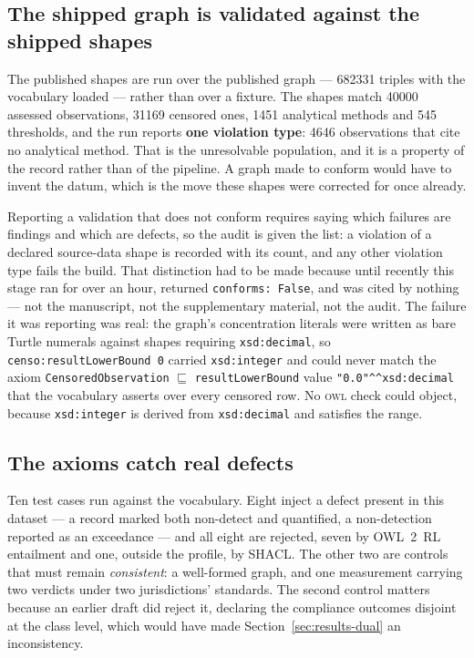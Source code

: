 \subsection{The shipped graph is validated against the shipped shapes}
\label{sec:results-shacl}
The published shapes are run over the published graph --- \num{682331} triples
with the vocabulary loaded --- rather than over a fixture.
The shapes match \num{40000} assessed observations, \num{31169} censored ones,
\num{1451} analytical methods and \num{545} thresholds, and the run reports
\textbf{one violation type}: \num{4646} observations that cite no analytical
method. That is the unresolvable population, and it is a property of the record
rather than of the pipeline. A graph made to conform would have to invent the
datum, which is the move these shapes were corrected for once already.

Reporting a validation that does not conform requires saying which failures are
findings and which are defects, so the audit is given the list: a violation of a
declared source-data shape is recorded with its count, and any other violation
type fails the build. That distinction had to be made
because until recently this stage ran for over an hour, returned
\texttt{conforms: False}, and was cited by nothing --- not the manuscript, not
the supplementary material, not the audit. The failure it was reporting was
real: the graph's concentration literals were written as bare Turtle
numerals against shapes requiring \texttt{xsd:decimal}, so
\texttt{censo:resultLowerBound 0} carried \texttt{xsd:integer} and could never match the axiom
\texttt{CensoredObservation} $\sqsubseteq$ \texttt{resultLowerBound} value
\texttt{"0.0"\^{}\^{}xsd:decimal} that the vocabulary asserts over every censored
row. No \textsc{owl} check could object, because \texttt{xsd:integer} is derived
from \texttt{xsd:decimal} and satisfies the range.

\subsection{The axioms catch real defects}
Ten test cases run against the vocabulary. Eight
inject a defect present in this dataset --- a record marked both non-detect and
quantified, a non-detection reported as an exceedance --- and all eight are
rejected, seven by OWL~2~RL entailment and one, outside the profile, by SHACL.
The other two are controls that must remain \emph{consistent}: a well-formed
graph, and one measurement carrying two verdicts under two jurisdictions'
standards. The second control matters because an earlier draft did reject it,
declaring the compliance outcomes disjoint at the class level, which would have
made Section~\ref{sec:results-dual} an inconsistency.

